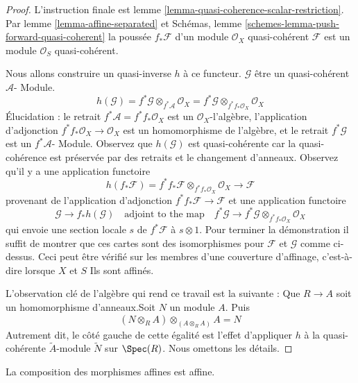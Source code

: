 \begin{proof}
L'instruction finale est lemme \ref{lemma-quasi-coherence-scalar-restriction}. Par lemme \ref{lemma-affine-separated} et Schémas, lemme \ref{schemes-lemma-push-forward-quasi-coherent} la poussée $f_*\mathcal{F}$ d'un module $\mathcal{O}_X$ quasi-cohérent $\mathcal{F}$ est un module $\mathcal{O}_S$ quasi-cohérent.

\medskip\noindent

Nous allons construire un quasi-inverse $h$ à ce functeur. $\mathcal{G}$
être un quasi-cohérent $\mathcal{A}$- Module.
$$
h(\mathcal{G}) = f^*\mathcal{G} \otimes_{f^*\mathcal{A}} \mathcal{O}_X =
f^*\mathcal{G} \otimes_{f^*f_*\mathcal{O}_X} \mathcal{O}_X
$$
Élucidation : le retrait $f^*\mathcal{A} = f^*f_*\mathcal{O}_X$
est un $\mathcal{O}_X$-l'algèbre, l'application d'adjonction
$f^*f_*\mathcal{O}_X \to \mathcal{O}_X$ est un homomorphisme de l'algèbre, et le retrait $f^*\mathcal{G}$ est un $f^*\mathcal{A}$- Module. Observez que
$h(\mathcal{G})$ est quasi-cohérente car la quasi-cohérence est préservée par des retraits et le changement d'anneaux. Observez qu'il y a une application functoire
$$
h(f_*\mathcal{F}) =
f^*f_*\mathcal{F} \otimes_{f^*f_*\mathcal{O}_X} \mathcal{O}_X \to \mathcal{F}
$$
provenant de l'application d'adjonction $f^*f_*\mathcal{F} \to \mathcal{F}$ et une application functoire
$$
\mathcal{G} \to f_*h(\mathcal{G}) \quad\text{adjoint to the map}\quad
f^*\mathcal{G} \to f^*\mathcal{G} \otimes_{f^*f_*\mathcal{O}_X} \mathcal{O}_X
$$
qui envoie une section locale $s$ de $f^*\mathcal{F}$ à $s \otimes 1$. Pour terminer la démonstration il suffit de montrer que ces cartes sont des isomorphismes pour $\mathcal{F}$ et $\mathcal{G}$ comme ci-dessus. Ceci peut être vérifié sur les membres d'une couverture d'affinage, c'est-à-dire lorsque $X$ et $S$ Ils sont affinés.

\medskip\noindent
L'observation clé de l'algèbre qui rend ce travail est la suivante : Que $R \to A$ soit un homomorphisme d'anneaux.Soit $N$ un module $A$. Puis $$
(N \otimes_R A) \otimes_{(A \otimes_R A)} A = N
$$ Autrement dit, le côté gauche de cette égalité est l'effet d'appliquer $h$ à la quasi-cohérente $\widetilde{A}$-module $\widetilde{N}$ sur $\Spec(R)$. Nous omettons les détails.
\end{proof}

\begin{lemma}

\label{lemma-composition-affine}

La composition des morphismes affines est affine.

\end{lemma}

